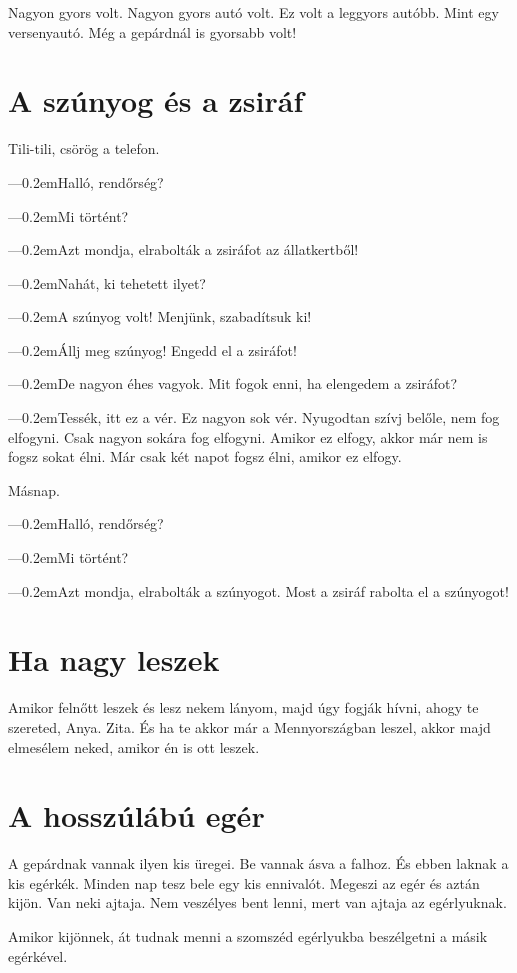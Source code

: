 \documentclass[12pt]{memoir}
\def\dash{---\kern 0.2em}
\begin{document}
Nagyon gyors volt. Nagyon gyors autó volt. Ez volt a leggyors autóbb. Mint egy
versenyautó. Még a gepárdnál is gyorsabb volt!


\section{A szúnyog és a zsiráf}
Tili-tili, csörög a telefon.

\dash Halló, rendőrség?

\dash Mi történt?

\dash Azt mondja, elrabolták a zsiráfot az állatkertből!

\dash Nahát, ki tehetett ilyet?

\dash A szúnyog volt! Menjünk, szabadítsuk ki!

\dash Állj meg szúnyog! Engedd el a zsiráfot!

\dash De nagyon éhes vagyok. Mit fogok enni, ha elengedem a zsiráfot?

\dash Tessék, itt ez a vér. Ez nagyon sok vér. Nyugodtan szívj belőle, nem fog
elfogyni. Csak nagyon sokára fog elfogyni. Amikor ez elfogy, akkor már nem is
fogsz sokat élni. Már csak két napot fogsz élni, amikor ez elfogy.

\bigskip

Másnap.

\dash Halló, rendőrség?

\dash Mi történt?

\dash Azt mondja, elrabolták a szúnyogot. Most a zsiráf rabolta el a szúnyogot!


\section{Ha nagy leszek}
Amikor felnőtt leszek és lesz nekem lányom, majd úgy fogják hívni, ahogy te
szereted, Anya. Zita. És ha te akkor már a Mennyországban leszel, akkor majd
elmesélem neked, amikor én is ott leszek.


\section{A hosszúlábú egér}
A gepárdnak vannak ilyen kis üregei. Be vannak ásva a falhoz. És ebben laknak a
kis egérkék. Minden nap tesz bele egy kis ennivalót. Megeszi az egér és aztán
kijön. Van neki ajtaja. Nem veszélyes bent lenni, mert van ajtaja az
egérlyuknak.

Amikor kijönnek, át tudnak menni a szomszéd egérlyukba beszélgetni a másik
egérkével.
\end{document}
